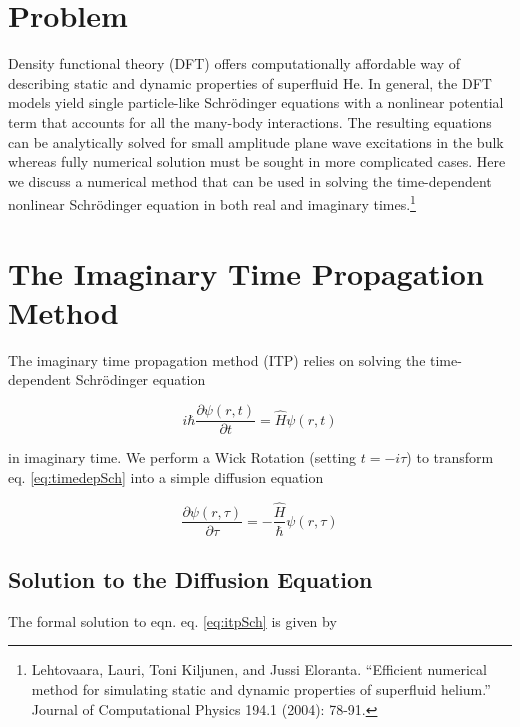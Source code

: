 \section{Problem}\label{problem}

Density functional theory (DFT) offers computationally affordable way of
describing static and dynamic properties of superfluid He. In general,
the DFT models yield single particle-like Schrödinger equations with a
nonlinear potential term that accounts for all the many-body
interactions. The resulting equations can be analytically solved for
small amplitude plane wave excitations in the bulk whereas fully
numerical solution must be sought in more complicated cases. Here we
discuss a numerical method that can be used in solving the
time-dependent nonlinear Schrödinger equation in both real and imaginary
times.\footnote{Lehtovaara, Lauri, Toni Kiljunen, and Jussi Eloranta.
  ``Efficient numerical method for simulating static and dynamic
  properties of superfluid helium.'' Journal of Computational Physics
  194.1 (2004): 78-91.}

\section{The Imaginary Time Propagation
Method}\label{the-imaginary-time-propagation-method}

The imaginary time propagation method (ITP) relies on solving the
time-dependent Schrödinger equation

\begin{equation}
\label{eq:timedepSch}
i\hbar\frac{\partial \psi(r,t)}{\partial t}= \hat{H}\psi(r,t)
\end{equation}

in imaginary time. We perform a Wick Rotation (setting \(t=-i\tau\)) to
transform eq. \ref{eq:timedepSch} into a simple diffusion equation

\begin{equation}
\label{eq:itpSch}
\frac{\partial \psi(r,\tau)}{\partial
\tau}=-\frac{\hat{H}}{\hbar}\psi(r,\tau)
\end{equation}

\subsection{Solution to the Diffusion
Equation}\label{solution-to-the-diffusion-equation}

The formal solution to eqn. eq. \ref{eq:itpSch} is given by

